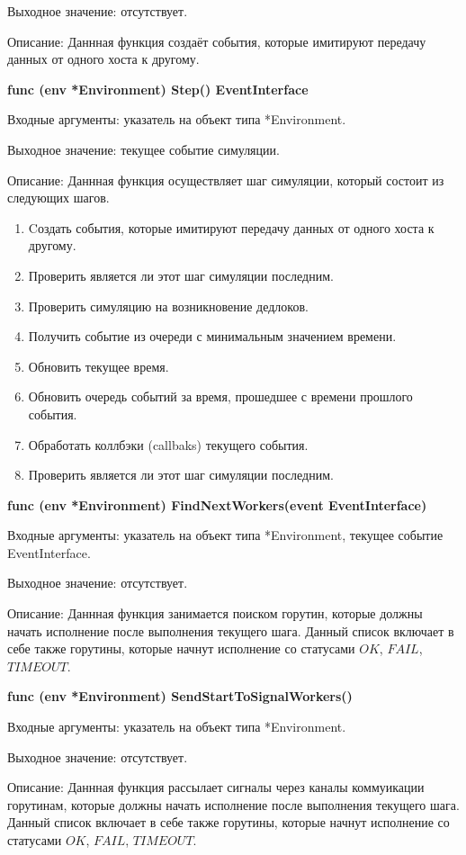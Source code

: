 Выходное значение: отсутствует.

Описание: Даннная функция создаёт события, которые имитируют передачу данных от одного хоста к другому.

\textbf{func (env *Environment) Step() EventInterface }

Входные аргументы: указатель на объект типа *Environment.

Выходное значение: текущее событие симуляции.

Описание: Даннная функция осуществляет шаг симуляции, который состоит из следующих шагов. 
\begin{enumerate}
\item Cоздать события, которые имитируют передачу данных от одного хоста к другому.
\item Проверить является ли этот шаг симуляции последним.
\item Проверить симуляцию на возникновение дедлоков.
\item Получить событие из очереди с минимальным значением времени.
\item Обновить текущее время.
\item Обновить очередь событий за время, прошедшее с времени прошлого события.
\item Обработать коллбэки (callbaks) текущего события.
\item Проверить является ли этот шаг симуляции последним.

\end{enumerate}

\textbf{func (env *Environment) FindNextWorkers(event EventInterface)}

Входные аргументы: указатель на объект типа *Environment, текущее событие EventInterface.

Выходное значение: отсутствует. 

Описание: Даннная функция занимается поиском горутин, которые должны начать исполнение после выполнения текущего шага. Данный список включает в себе также горутины, которые начнут исполнение со статусами $OK$, $FAIL$, $TIMEOUT$.

\textbf{func (env *Environment) SendStartToSignalWorkers()}

Входные аргументы: указатель на объект типа *Environment.

Выходное значение: отсутствует. 

Описание: Даннная функция рассылает сигналы через каналы коммуикации горутинам, которые должны начать исполнение после выполнения текущего шага. Данный список включает в себе также горутины, которые начнут исполнение со статусами $OK$, $FAIL$, $TIMEOUT$.

